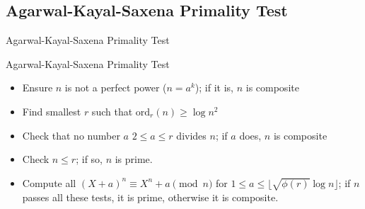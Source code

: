 \documentclass[pdf,aspectratio=169]{beamer}
\begin{document}

\subsection{Agarwal-Kayal-Saxena Primality Test}
\begin{frame}{Agarwal-Kayal-Saxena Primality Test}
    \begin{outline}
        \pause
    \end{outline}
\end{frame}

\begin{frame}{Agarwal-Kayal-Saxena Primality Test}
    \begin{outline}
        \begin{itemize}
                \pause
            \item{Ensure $n$ is not a perfect power ($n = a^k$); if it is, $n$ is composite}
                \pause
            \item{Find smallest $r$ such that $\textrm{ord}_r(n) \ge \log{n}^2$}
                \pause
            \item{Check that no number $a$ $2 \leq a \leq r$ divides $n$; if $a$ does, $n$ is composite}
                \pause
            \item{Check $n \leq r$; if so, $n$ is prime.}
                \pause
            \item{Compute all $(X + a)^n \equiv X^n + a \pmod{n}$ for $1 \leq a \leq \lfloor \sqrt{\phi(r)} \log{n} \rfloor$; if $n$ passes all these tests, it is prime, otherwise it is composite.}
        \end{itemize}
    \end{outline}
\end{frame}
\end{document}
